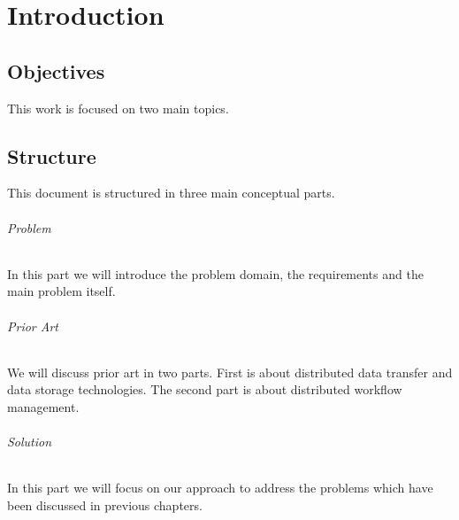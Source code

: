 \chapter{Introduction}
\label{cha:introduction}

\section{Objectives}
This work is focused on two main topics. 
\section{Structure}
This document is structured in three main conceptual parts.
\subparagraph{Problem} In this part we will introduce the problem domain, the 
requirements and the main problem itself.
\subparagraph{Prior Art} We will discuss prior art in two parts. First is about
distributed data transfer and data storage technologies. The second part is about
distributed workflow management.
\subparagraph{Solution} In this part we will focus on our approach to address the
problems which have been discussed in previous chapters.